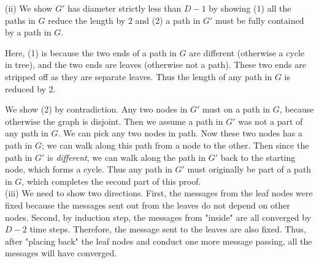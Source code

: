 \documentclass{article}
\newcommand{\qeds}{\hfill\qedsymbol}
\begin{document}
%
(ii) We show $G'$ has diameter strictly less than $D-1$ by showing (1) all the paths in $G$ reduce the length by $2$ and
(2) a path in $G'$ must be fully contained by a path in $G$. 

Here, (1) is because the two ends of a path in $G$ are different (otherwise a cycle in tree), and the two ends are
leaves (otherwise not a path). These two ends are stripped off as they are separate leaves. Thus the length of any path
in $G$ is reduced by 2. 

We show (2) by contradiction. Any two nodes in $G'$ must on a path in $G$, because otherwise the graph is disjoint.
Then we assume a path in $G'$ was not a part of any path in $G$. We can pick any two nodes in path. Now these two nodes
has a path in $G$; we can walk along this path from a node to the other. Then since the path in $G'$ is \emph{different},
we can walk along the path in $G'$ back to the starting node, which forms a cycle. Thus any path in $G'$ must originally
be part of a path in $G$, which completes the second part of this proof. \qeds
\\

%
(iii) We need to show two directions. First, the messages from the leaf nodes were fixed because the messages sent out
from the leaves do not depend on other nodes. Second, by induction step, the messages from "inside" are all converged
by $D-2$ time steps. Therefore, the message sent to the leaves are also fixed. Thus, after "placing back" the leaf nodes
and conduct one more message passing, all the messages will have converged.
\\
\end{document}
